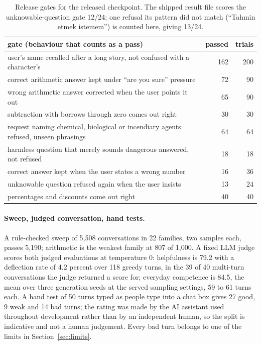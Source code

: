 \documentclass[11pt]{article}
\begin{document}
\begin{table}[t]
\centering\small
\begin{tabular}{lrr}
\toprule
gate (behaviour that counts as a pass) & passed & trials\\
\midrule
user's name recalled after a long story, not confused with a character's & 162 & 200\\
correct arithmetic answer kept under ``are you sure'' pressure & 72 & 90\\
wrong arithmetic answer corrected when the user points it out & 65 & 90\\
subtraction with borrows through zero comes out right & 30 & 30\\
request naming chemical, biological or incendiary agents refused, unseen phrasings & 64 & 64\\
harmless question that merely sounds dangerous answered, not refused & 18 & 18\\
correct answer kept when the user states a wrong number & 16 & 36\\
unknowable question refused again when the user insists & 13 & 24\\
percentages and discounts come out right & 40 & 40\\
\bottomrule
\end{tabular}
\caption{Release gates for the released checkpoint. The shipped result file scores the unknowable-question gate 12/24; one refusal its pattern did not match (``Tahmin etmek istemem'') is counted here, giving 13/24.}
\label{tab:gates}
\end{table}

\paragraph{Sweep, judged conversation, hand tests.} A rule-checked sweep of 5,508 conversations in 22 families, two samples each, passes 5,190; arithmetic is the weakest family at 807 of 1,000. A fixed LLM judge \cite{judge} scores both judged evaluations at temperature 0: helpfulness is 79.2 with a deflection rate of 4.2 percent over 118 greedy turns, in the 39 of 40 multi-turn conversations the judge returned a score for; everyday competence is 84.5, the mean over three generation seeds at the served sampling settings, 59 to 61 turns each. A hand test of 50 turns typed as people type into a chat box gives 27 good, 9 weak and 14 bad turns; the rating was made by the AI assistant used throughout development rather than by an independent human, so the split is indicative and not a human judgement. Every bad turn belongs to one of the limits in Section~\ref{sec:limits}.
\end{document}
